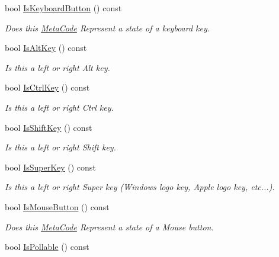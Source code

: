 \begin{DoxyCompactItemize}
bool \hyperlink{classphys_1_1MetaCode_ad86e1599eccea8edecb721eb84c06c72}{IsKeyboardButton} () const 
\begin{DoxyCompactList}\small\item\em Does this \hyperlink{classphys_1_1MetaCode}{MetaCode} Represent a state of a keyboard key. \item\end{DoxyCompactList}\item 
bool \hyperlink{classphys_1_1MetaCode_a080323eaed78e0f9b9b3f2049ee036a1}{IsAltKey} () const 
\begin{DoxyCompactList}\small\item\em Is this a left or right Alt key. \item\end{DoxyCompactList}\item 
bool \hyperlink{classphys_1_1MetaCode_a25ce58069979e189e91ecbd77729ed22}{IsCtrlKey} () const 
\begin{DoxyCompactList}\small\item\em Is this a left or right Ctrl key. \item\end{DoxyCompactList}\item 
bool \hyperlink{classphys_1_1MetaCode_a2b2e4758229d1bba55ab47a2ca57863e}{IsShiftKey} () const 
\begin{DoxyCompactList}\small\item\em Is this a left or right Shift key. \item\end{DoxyCompactList}\item 
bool \hyperlink{classphys_1_1MetaCode_a8b63b7227b27c2be9de969c6b3a0963a}{IsSuperKey} () const 
\begin{DoxyCompactList}\small\item\em Is this a left or right Super key (Windows logo key, Apple logo key, etc...). \item\end{DoxyCompactList}\item 
bool \hyperlink{classphys_1_1MetaCode_a95fd9fa05a35711c5970490cee7889d1}{IsMouseButton} () const 
\begin{DoxyCompactList}\small\item\em Does this \hyperlink{classphys_1_1MetaCode}{MetaCode} Represent a state of a Mouse button. \item\end{DoxyCompactList}\item 
bool \hyperlink{classphys_1_1MetaCode_ac8709e0a9791db4cbd0fe9f6089efd57}{IsPollable} () const 

\end{DoxyCompactItemize}
